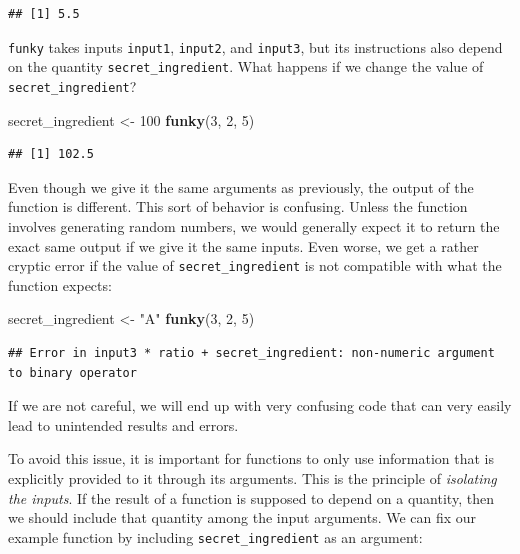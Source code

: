 \documentclass[
]{book}
\newenvironment{Shaded}{\begin{snugshade}}{\end{snugshade}}
\newcommand{\DecValTok}[1]{\textcolor[rgb]{0.00,0.00,0.81}{#1}}
\newcommand{\FunctionTok}[1]{\textcolor[rgb]{0.13,0.29,0.53}{\textbf{#1}}}
\newcommand{\NormalTok}[1]{#1}
\newcommand{\OtherTok}[1]{\textcolor[rgb]{0.56,0.35,0.01}{#1}}
\newcommand{\StringTok}[1]{\textcolor[rgb]{0.31,0.60,0.02}{#1}}
\begin{document}
\begin{verbatim}
## [1] 5.5
\end{verbatim}

\texttt{funky} takes inputs \texttt{input1}, \texttt{input2}, and \texttt{input3}, but its instructions also depend on the quantity \texttt{secret\_ingredient}.
What happens if we change the value of \texttt{secret\_ingredient}?

\begin{Shaded}
\begin{Highlighting}[]
\NormalTok{secret\_ingredient }\OtherTok{\textless{}{-}} \DecValTok{100}
\FunctionTok{funky}\NormalTok{(}\DecValTok{3}\NormalTok{, }\DecValTok{2}\NormalTok{, }\DecValTok{5}\NormalTok{)}
\end{Highlighting}
\end{Shaded}

\begin{verbatim}
## [1] 102.5
\end{verbatim}

Even though we give it the same arguments as previously, the output of the function is different.
This sort of behavior is confusing.
Unless the function involves generating random numbers, we would generally expect it to return the exact same output if we give it the same inputs.
Even worse, we get a rather cryptic error if the value of \texttt{secret\_ingredient} is not compatible with what the function expects:

\begin{Shaded}
\begin{Highlighting}[]
\NormalTok{secret\_ingredient }\OtherTok{\textless{}{-}} \StringTok{"A"}
\FunctionTok{funky}\NormalTok{(}\DecValTok{3}\NormalTok{, }\DecValTok{2}\NormalTok{, }\DecValTok{5}\NormalTok{)}
\end{Highlighting}
\end{Shaded}

\begin{verbatim}
## Error in input3 * ratio + secret_ingredient: non-numeric argument to binary operator
\end{verbatim}

If we are not careful, we will end up with very confusing code that can very easily lead to unintended results and errors.

To avoid this issue, it is important for functions to only use information that is explicitly provided to it through its arguments.
This is the principle of \emph{isolating the inputs}.
If the result of a function is supposed to depend on a quantity, then we should include that quantity among the input arguments.
We can fix our example function by including \texttt{secret\_ingredient} as an argument:
\end{document}
